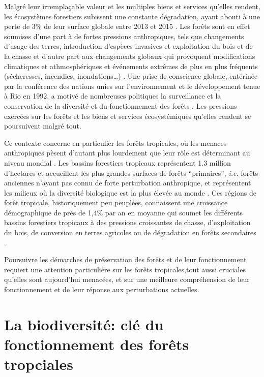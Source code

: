 \documentclass[
  11pt,
  french,
  A4paper,
  extrafontsizes,onecolumn,openright
  ]{memoir}
\begin{document}
Malgré leur irremplaçable valeur et les multiples biens et services
qu'elles rendent, les écosystèmes forestiers subissent une constante
dégradation, ayant abouti à une perte de 3\% de leur surface globale
entre 2013 et 2015 \autocite{FAO2009}. Les forêts sont en effet soumises
d'une part à de fortes pressions anthropiques, tels que changements
d'usage des terres, introduction d'espèces invasives et exploitation du
bois et de la chasse et d'autre part aux changements globaux qui
provoquent modifications climatiques et athmosphériques et événements
extrêmes de plus en plus fréquents (sécheresses, incendies,
inondations\ldots{}) \autocite{Pachauri2014}. Une prise de conscience
globale, entérinée par la conférence des nations unies sur
l'environnement et le développement tenue à Rio en 1992, a motivé de
nombreuses politiques la surveillance et la conservation de la diversité
et du fonctionnement des forêts
\autocites{Summit1992}{Schlaepfer2000}{Dirzo2003a}{Morales-Hidalgo2015}.
Les pressions exercées sur les forêts et les biens et services
écosystémiques qu'elles rendent se poursuivent malgré tout.

Ce contexte concerne en particulier les forêts tropicales, où les
menaces anthropiques pèsent d'autant plus lourdement que leur rôle est
déterminant au niveau mondial \autocites{Dirzo2003a}{Hansen2013}. Les
bassins forestiers tropicaux représentent 1.3 million d'hectares et
accueillent les plus grandes surfaces de forêts ``primaires'',
\emph{i.e.} forêts anciennes n'ayant pas connu de forte perturbation
anthropique, et représentent les milieux où la diversité biologique est
la plus élevée au monde \autocites{Gentry1988}{FAO2011}. Ces régions de
forêt tropicale, historiquement peu peuplées, connaissent une croissance
démographique de près de 1,4\% par an en moyanne qui soumet les
différents bassins forestiers tropicaux à des pressions croissantes de
chasse, d'exploitation du bois, de conversion en terres agricoles ou de
dégradation en forêts secondaires \autocite{Asner2009}.

Poursuivre les démarches de préservation des forêts et de leur
fonctionnement requiert une attention particulière sur les forêts
tropicales,tout aussi cruciales qu'elles sont aujourd'hui menacées, et
sur une meilleure compréhension de leur fonctionnement et de leur
réponse aux perturbations actuelles.

\section{La biodiversité: clé du fonctionnement des forêts
tropciales}\label{la-biodiversite-cle-du-fonctionnement-des-forets-tropciales}
\end{document}
